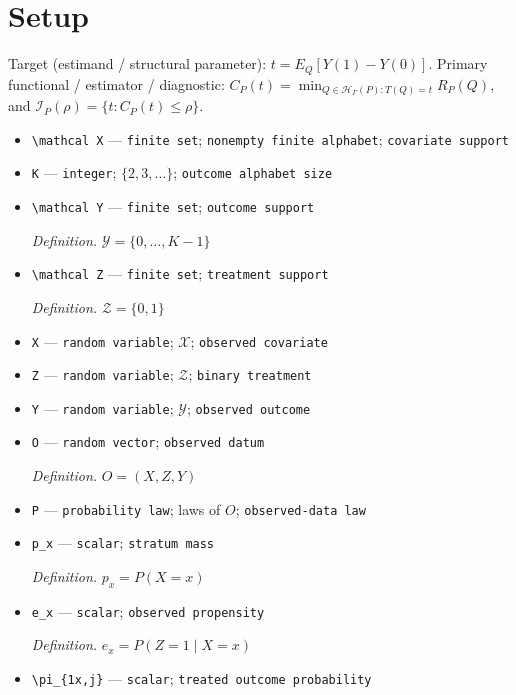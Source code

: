 \documentclass{article}
\begin{document}
\section{Setup}

Target (estimand / structural parameter): \(t=E_Q[Y(1)-Y(0)]\).
Primary functional / estimator / diagnostic: \(C_P(t)=\min_{Q\in\mathcal H_\Gamma(P):T(Q)=t}R_P(Q)\), and \(\mathcal I_P(\rho)=\{t:C_P(t)\leq\rho\}\).
\begin{itemize}
  \item \texttt{\textbackslash{}\allowbreak{}mathcal X} --- \texttt{finite set}; \texttt{nonempty finite alphabet}; \texttt{covariate support}
  \item \texttt{K} --- \texttt{integer}; \(\{2,3,\ldots\}\); \texttt{outcome alphabet size}
  \item \texttt{\textbackslash{}\allowbreak{}mathcal Y} --- \texttt{finite set}; \texttt{outcome support}
  \par\smallskip\noindent\emph{Definition.} \(\mathcal Y=\{0,\ldots,K-1\}\)
  \item \texttt{\textbackslash{}\allowbreak{}mathcal Z} --- \texttt{finite set}; \texttt{treatment support}
  \par\smallskip\noindent\emph{Definition.} \(\mathcal Z=\{0,1\}\)
  \item \texttt{X} --- \texttt{random variable}; \(\mathcal X\); \texttt{observed covariate}
  \item \texttt{Z} --- \texttt{random variable}; \(\mathcal Z\); \texttt{binary treatment}
  \item \texttt{Y} --- \texttt{random variable}; \(\mathcal Y\); \texttt{observed outcome}
  \item \texttt{O} --- \texttt{random vector}; \texttt{observed datum}
  \par\smallskip\noindent\emph{Definition.} \(O=(X,Z,Y)\)
  \item \texttt{P} --- \texttt{probability law}; laws of \(O\); \texttt{observed-\allowbreak{}data law}
  \item \texttt{p\_\allowbreak{}x} --- \texttt{scalar}; \texttt{stratum mass}
  \par\smallskip\noindent\emph{Definition.} \(p_x=P(X=x)\)
  \item \texttt{e\_\allowbreak{}x} --- \texttt{scalar}; \texttt{observed propensity}
  \par\smallskip\noindent\emph{Definition.} \(e_x=P(Z=1\mid X=x)\)
  \item \texttt{\textbackslash{}\allowbreak{}pi\_\allowbreak{}\{1x,\allowbreak{}j\}\allowbreak{}} --- \texttt{scalar}; \texttt{treated outcome probability}

\end{itemize}
\end{document}
